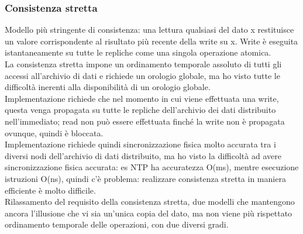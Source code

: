 \documentclass{article}
\begin{document}
\subsubsection{Consistenza stretta}
Modello più stringente di consistenza: una lettura qualsiasi del dato x restituisce un valore corrispondente al risultato più recente della write su x. Write è eseguita istantaneamente su tutte le repliche come una singola operazione atomica. \\ La consistenza stretta impone un ordinamento temporale assoluto di tutti gli accessi all'archivio di dati e richiede un orologio globale, ma ho visto tutte le difficoltà inerenti alla disponibilità di un orologio globale.\\ Implementazione richiede che nel momento in cui viene effettuata una write, questa venga propagata su tutte le repliche dell'archivio dei dati distribuito nell'immediato; read non può essere effettuata finché la write non è propagata ovunque, quindi è bloccata.\\ Implementazione richiede quindi sincronizzazione fisica molto accurata tra i diversi nodi dell'archivio di dati distribuito, ma ho visto la difficoltà ad avere sincronizzazione fisica accurata: es NTP ha accuratezza O(ms), mentre esecuzione istruzioni O(ns), quindi c'è problema: realizzare consistenza stretta in maniera efficiente è molto difficile. \\ Rilassamento del requisito della consistenza stretta, due modelli che mantengono ancora l'illusione che vi sia un'unica copia del dato, ma non viene più rispettato ordinamento temporale delle operazioni, con due diversi gradi.
\end{document}
